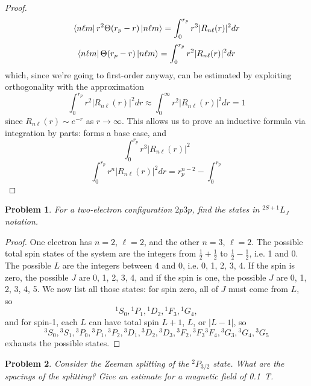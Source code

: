 \documentclass{article}
\newtheorem{plm}{Problem}
\begin{document}
\begin{proof}
\[  \]
  \[
    \bra{n\ell m} r^{2}\Theta(r_{p} - r) \ket{n\ell m} = \int_{0}^{r_{p}}r^{3}|R_{n\ell}(r)|^{2}dr
  \]
  \[
    \bra{n\ell m}\Theta(r_{p} - r) \ket{n\ell m} = \int_{0}^{r_{p}}r^{2}|R_{n\ell}(r)|^{2}dr
  \]
  which, since we're going to first-order anyway, can be estimated by exploiting orthogonality with the approximation
  \[
    \int_{0}^{r_{p}}r^{2}|R_{n\ell}(r)|^{2}dr \approx \int_{0}^{\infty}r^{2}|R_{n\ell}(r)|^{2}dr = 1
  \]
  since $R_{n\ell}(r) \sim e^{-r}$ as $r \to \infty$.
  This allows us to prove an inductive formula via integration by parts: forms a base case, and
  \[
    \int_{0}^{r_{p}}r^{3}|R_{n\ell}(r)|^{2}
  \]
  \[
    \int_{0}^{r_{p}}r^{n}|R_{n\ell}(r)|^{2}dr = r_{p}^{n-2} - \int_{0}^{r_{p}}
  \]

\end{proof}

\begin{plm}
  For a two-electron configuration $2p3p$, find the states in $^{2S+1}L_{J}$ notation.
\end{plm}

\begin{proof}
  One electron has $n = 2$, $\ell = 2$, and the other $n = 3$, $\ell = 2$.
  The possible total spin states of the system are the integers from $\frac{1}{2} + \frac{1}{2}$ to $\frac{1}{2} - \frac{1}{2}$, i.e. 1 and 0.
  The possible $L$ are the integers between $4$ and $0$, i.e. 0, 1, 2, 3, 4.
  If the spin is zero, the possible $J$ are 0, 1, 2, 3, 4, and if the spin is one, the possible $J$ are 0, 1, 2, 3, 4, 5.
  We now list all those states: for spin zero, all of $J$ must come from $L$, so
  \[
    {}^{1}S_{0}, {}^{1}P_{1}, {}^{1}D_{2}, {}^{1}F_{3}, {}^{1}G_{4},
  \]
  and for spin-1, each $L$ can have total spin $L + 1$, $L$, or $|L - 1|$, so
  \[
    {}^{3}S_{0}, {}^{3}S_{1}, {}^{3}P_{0}, {}^{3}P_{1}, {}^{3}P_{2}, {}^{3}D_{1}, {}^{3}D_{2}, {}^{3}D_{3}, {}^{3}F_{2}, {}^{3}F_{3} {}^{3}F_{4},
    {}^{3}G_{3}, {}^{3}G_{4}, {}^{3}G_{5}
  \]
  exhausts the possible states.
\end{proof}

\begin{plm}
  Consider the Zeeman splitting of the $^{2}P_{3/2}$ state.
  What are the spacings of the splitting?
  Give an estimate for a magnetic field of \SI{0.1}{T}.
\end{plm}
\end{document}

